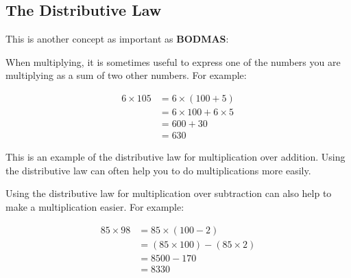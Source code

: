 \subsection{The Distributive Law}
This is another concept as important as \textbf{BODMAS}:

When multiplying, it is sometimes useful to express one of the numbers you are multiplying as a sum of two other numbers. For example:

\[
\begin{aligned}
6 \times 105 & =6 \times(100+5) \\
& =6 \times 100+6 \times 5 \\
& =600+30 \\
& =630
\end{aligned}
\]

This is an example of the distributive law for multiplication over addition. Using the distributive law can often help you to do multiplications more easily.

Using the distributive law for multiplication over subtraction can also help to make a multiplication easier. For example:

\[
\begin{aligned}
85 \times 98 & =85 \times(100-2) \\
& =(85 \times 100)-(85 \times 2) \\
& =8500-170 \\
& =8330
\end{aligned}
\]

